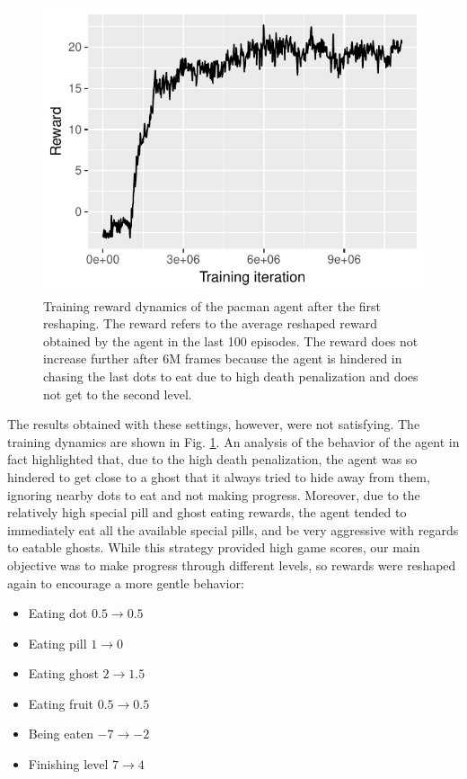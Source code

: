 \documentclass[10pt,twocolumn,letterpaper]{article}
\begin{document}
\begin{figure}
	\includegraphics[width=\linewidth]{run_results/reward_afraid.pdf}
	\caption{Training reward dynamics of the pacman agent after the first reshaping. The reward refers to the average reshaped reward obtained by the agent in the last 100 episodes. The reward does not increase further after 6M frames because the agent is hindered in chasing the last dots to eat due to high death penalization and does not get to the second level.}
	\label{fig:rewardPacmanAfraid}
\end{figure}

The results obtained with these settings, however, were not satisfying. The training dynamics are shown in Fig. \ref{fig:rewardPacmanAfraid}. An analysis of the behavior of the agent in fact highlighted that, due to the high death penalization, the agent was so hindered to get close to a ghost that it always tried to hide away from them, ignoring nearby dots to eat and not making progress. Moreover, due to the relatively high special pill and ghost eating rewards, the agent tended to immediately eat all the available special pills, and be very aggressive with regards to eatable ghosts. While this strategy provided high game scores, our main objective was to make progress through different levels, so rewards were reshaped again to encourage a more gentle behavior:
\begin{itemize}
	\item Eating dot $0.5 \rightarrow 0.5$
	\item Eating pill $1 \rightarrow 0$
	\item Eating ghost $2 \rightarrow 1.5$
	\item Eating fruit $0.5 \rightarrow 0.5$
	\item Being eaten $-7 \rightarrow -2$
	\item Finishing level $7 \rightarrow 4$
\end{itemize}
\end{document}
